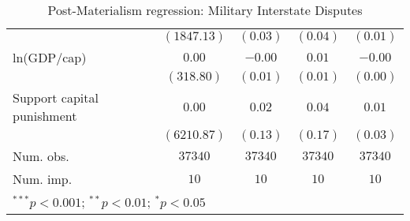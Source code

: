 \begin{table}
\begin{center}
\begin{tabular}{l c c c c}
                           & $(1847.13)$   & $(0.03)$     & $(0.04)$     & $(0.01)$ \\
ln(GDP/cap)                & $0.00$        & $-0.00$      & $0.01$       & $-0.00$  \\
                           & $(318.80)$    & $(0.01)$     & $(0.01)$     & $(0.00)$ \\
Support capital punishment & $0.00$        & $0.02$       & $0.04$       & $0.01$   \\
                           & $(6210.87)$   & $(0.13)$     & $(0.17)$     & $(0.03)$ \\
\midrule
Num. obs.                  & $37340$       & $37340$      & $37340$      & $37340$  \\
Num. imp.                  & $10$          & $10$         & $10$         & $10$     \\
\bottomrule
\multicolumn{5}{l}{\scriptsize{$^{***}p<0.001$; $^{**}p<0.01$; $^{*}p<0.05$}}
\end{tabular}
\caption{Post-Materialism regression: Military Interstate Disputes}
\label{MIDIng}
\end{center}
\end{table}
